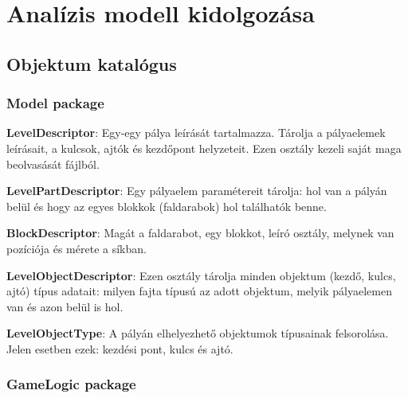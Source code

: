 


\setcounter{section}{2}




\fedlap

\section{Analízis modell kidolgozása}

\subsection{Objektum katalógus}

\subsubsection{Model package}

\textbf{LevelDescriptor}: Egy-egy pálya leírását tartalmazza. Tárolja a pályaelemek leírásait, a kulcsok, ajtók és kezdőpont helyzeteit. Ezen osztály kezeli saját maga beolvasását fájlból.

\textbf{LevelPartDescriptor}: Egy pályaelem paramétereit tárolja: hol van a pályán belül és hogy az egyes blokkok (faldarabok) hol találhatók benne.

\textbf{BlockDescriptor}: Magát a faldarabot, egy blokkot, leíró osztály, melynek van pozíciója és mérete a síkban.

\textbf{LevelObjectDescriptor}: Ezen osztály tárolja minden objektum (kezdő, kulcs, ajtó) típus adatait: milyen fajta típusú az adott objektum, melyik pályaelemen van és azon belül is hol.

\textbf{LevelObjectType}: A pályán elhelyezhető objektumok típusainak felsorolása. Jelen esetben ezek: kezdési pont, kulcs és ajtó.

\subsubsection{GameLogic package}


